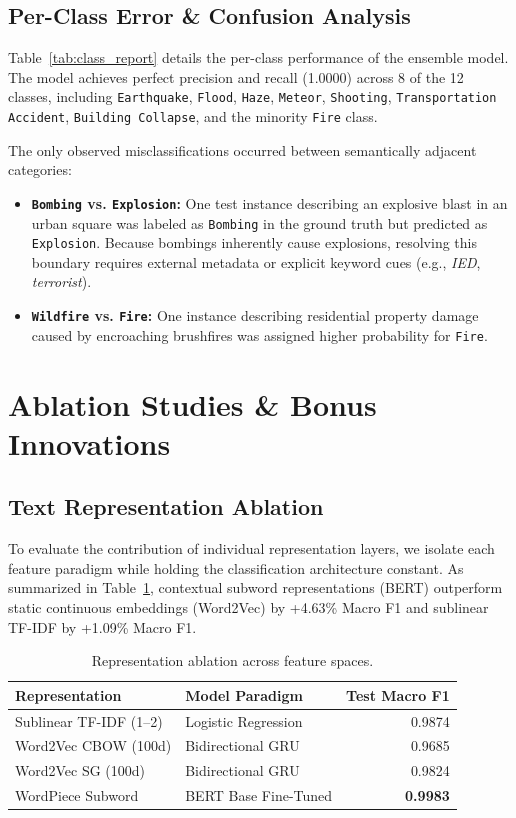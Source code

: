 \documentclass[11pt,a4paper]{article}
\begin{document}
\subsection{Per-Class Error & Confusion Analysis}
Table~\ref{tab:class_report} details the per-class performance of the ensemble model. The model achieves perfect precision and recall (1.0000) across 8 of the 12 classes, including \texttt{Earthquake}, \texttt{Flood}, \texttt{Haze}, \texttt{Meteor}, \texttt{Shooting}, \texttt{Transportation Accident}, \texttt{Building Collapse}, and the minority \texttt{Fire} class.

The only observed misclassifications occurred between semantically adjacent categories:
\begin{itemize}
    \item \textbf{\texttt{Bombing} vs. \texttt{Explosion}:} One test instance describing an explosive blast in an urban square was labeled as \texttt{Bombing} in the ground truth but predicted as \texttt{Explosion}. Because bombings inherently cause explosions, resolving this boundary requires external metadata or explicit keyword cues (e.g., \textit{IED}, \textit{terrorist}).
    \item \textbf{\texttt{Wildfire} vs. \texttt{Fire}:} One instance describing residential property damage caused by encroaching brushfires was assigned higher probability for \texttt{Fire}.
\end{itemize}

\section{Ablation Studies \& Bonus Innovations}
\label{sec:ablations}

\subsection{Text Representation Ablation}
To evaluate the contribution of individual representation layers, we isolate each feature paradigm while holding the classification architecture constant. As summarized in Table~\ref{tab:ablation_rep}, contextual subword representations (BERT) outperform static continuous embeddings (Word2Vec) by +4.63\% Macro F1 and sublinear TF-IDF by +1.09\% Macro F1.

\begin{table}[t]
\centering
\small
\begin{tabular}{llr}
\toprule
\textbf{Representation} & \textbf{Model Paradigm} & \textbf{Test Macro F1} \\
\midrule
Sublinear TF-IDF (1--2) & Logistic Regression & 0.9874 \\
Word2Vec CBOW (100d) & Bidirectional GRU & 0.9685 \\
Word2Vec SG (100d) & Bidirectional GRU & 0.9824 \\
WordPiece Subword & BERT Base Fine-Tuned & \textbf{0.9983} \\
\bottomrule
\end{tabular}
\caption{Representation ablation across feature spaces.}
\label{tab:ablation_rep}
\end{table}
\end{document}
